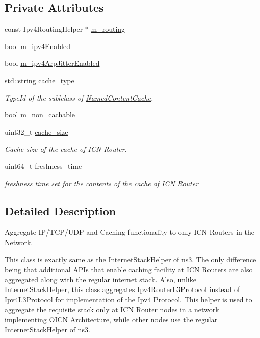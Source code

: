 \subsection*{Private Attributes}
\begin{DoxyCompactItemize}
\item 
const Ipv4\-Routing\-Helper $\ast$ \hyperlink{classns3_1_1RouterStackHelper_afce5b67df8aff1a4a8fca50a32d0d746}{m\-\_\-routing}
\item 
bool \hyperlink{classns3_1_1RouterStackHelper_a53fa9e728900f9fad07e49487b1b5131}{m\-\_\-ipv4\-Enabled}
\item 
bool \hyperlink{classns3_1_1RouterStackHelper_afb7a40b6e245447f3d9fd6e55afb9a6f}{m\-\_\-ipv4\-Arp\-Jitter\-Enabled}
\item 
std\-::string \hyperlink{classns3_1_1RouterStackHelper_a00676974faf0f9061cdfa64e2b2481f3}{cache\-\_\-type}
\begin{DoxyCompactList}\small\item\em Type\-Id of the sublclass of \hyperlink{classns3_1_1NamedContentCache}{Named\-Content\-Cache}. \end{DoxyCompactList}\item 
bool \hyperlink{classns3_1_1RouterStackHelper_a0c094073c949fe9d5bbe3ec66b2311e6}{m\-\_\-non\-\_\-cachable}
\item 
uint32\-\_\-t \hyperlink{classns3_1_1RouterStackHelper_af1bcf688f4db05e771f97c5cc3f151b9}{cache\-\_\-size}
\begin{DoxyCompactList}\small\item\em Cache size of the cache of I\-C\-N Router. \end{DoxyCompactList}\item 
uint64\-\_\-t \hyperlink{classns3_1_1RouterStackHelper_abde25db92b103214ca320f74a3fea16f}{freshness\-\_\-time}
\begin{DoxyCompactList}\small\item\em freshness time set for the contents of the cache of I\-C\-N Router \end{DoxyCompactList}\end{DoxyCompactItemize}


\subsection{Detailed Description}
Aggregate I\-P/\-T\-C\-P/\-U\-D\-P and Caching functionality to only I\-C\-N Routers in the Network. 

This class is exactly same as the Internet\-Stack\-Helper of \hyperlink{namespacens3}{ns3}. The only difference being that additional A\-P\-Is that enable caching facility at I\-C\-N Routers are also aggregated along with the regular internet stack. Also, unlike Internet\-Stack\-Helper, this class aggregates \hyperlink{classns3_1_1Ipv4RouterL3Protocol}{Ipv4\-Router\-L3\-Protocol} instead of Ipv4\-L3\-Protocol for implementation of the Ipv4 Protocol. This helper is used to aggregate the requisite stack only at I\-C\-N Router nodes in a network implementing O\-I\-C\-N Architecture, while other nodes use the regular Internet\-Stack\-Helper of \hyperlink{namespacens3}{ns3}. 

